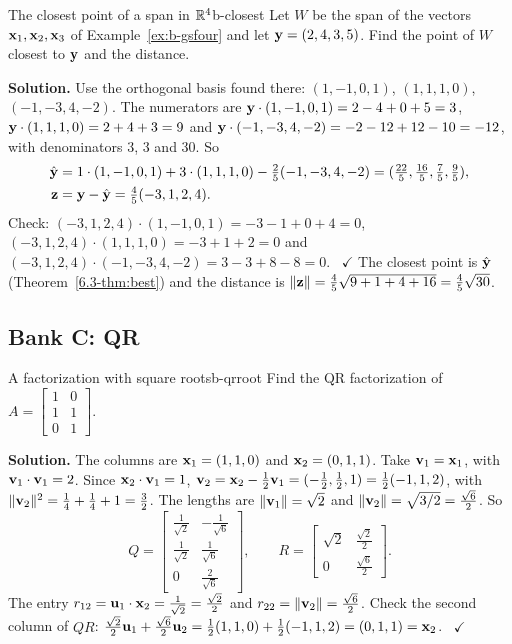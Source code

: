 \documentclass[11pt]{article}
\begin{document}
\begin{exmp}{The closest point of a span in $\mathbb{R}^4$}{b-closest}
Let $W$ be the span of the vectors $\mathbf{x}_1,\mathbf{x}_2,\mathbf{x}_3$ of Example~\ref{ex:b-gsfour} and let $\mathbf{y}=(2,4,3,5)$. Find the point of $W$ closest to $\mathbf{y}$ and the distance.

\textbf{Solution.} Use the orthogonal basis found there: $(1,-1,0,1)$, $(1,1,1,0)$, $(-1,-3,4,-2)$. The numerators are $\mathbf{y}\cdot(1,-1,0,1)=2-4+0+5=3$, $\mathbf{y}\cdot(1,1,1,0)=2+4+3=9$ and $\mathbf{y}\cdot(-1,-3,4,-2)=-2-12+12-10=-12$, with denominators $3$, $3$ and $30$. So
\[
\begin{aligned}\hat{\mathbf{y}}&=1\cdot(1,-1,0,1)+3\cdot(1,1,1,0)-\tfrac25(-1,-3,4,-2)=(\tfrac{22}5,\tfrac{16}5,\tfrac75,\tfrac95),\\\mathbf{z}&=\mathbf{y}-\hat{\mathbf{y}}=\tfrac45(-3,1,2,4).\end{aligned}
\]
Check: $(-3,1,2,4)\cdot(1,-1,0,1)=-3-1+0+4=0$, $(-3,1,2,4)\cdot(1,1,1,0)=-3+1+2=0$ and $(-3,1,2,4)\cdot(-1,-3,4,-2)=3-3+8-8=0$. \ $\checkmark$ The closest point is $\hat{\mathbf{y}}$ (Theorem~\ref{6.3-thm:best}) and the distance is $\lVert\mathbf{z}\rVert=\tfrac45\sqrt{9+1+4+16}=\tfrac45\sqrt{30}$.
\end{exmp}

\subsection*{Bank C: QR}
\begin{exmp}{A factorization with square roots}{b-qrroot}
Find the QR factorization of $A=\begin{bmatrix}1&0\\1&1\\0&1\end{bmatrix}$.

\textbf{Solution.} The columns are $\mathbf{x}_1=(1,1,0)$ and $\mathbf{x}_2=(0,1,1)$. Take $\mathbf{v}_1=\mathbf{x}_1$, with $\mathbf{v}_1\cdot\mathbf{v}_1=2$. Since $\mathbf{x}_2\cdot\mathbf{v}_1=1$, $\mathbf{v}_2=\mathbf{x}_2-\tfrac12\mathbf{v}_1=(-\tfrac12,\tfrac12,1)=\tfrac12(-1,1,2)$, with $\lVert\mathbf{v}_2\rVert^2=\tfrac14+\tfrac14+1=\tfrac32$. The lengths are $\lVert\mathbf{v}_1\rVert=\sqrt2$ and $\lVert\mathbf{v}_2\rVert=\sqrt{3/2}=\tfrac{\sqrt6}2$. So
\[
Q=\begin{bmatrix}\tfrac1{\sqrt2}&-\tfrac1{\sqrt6}\\[2pt]\tfrac1{\sqrt2}&\tfrac1{\sqrt6}\\[2pt]0&\tfrac2{\sqrt6}\end{bmatrix},\qquad R=\begin{bmatrix}\sqrt2&\tfrac{\sqrt2}2\\0&\tfrac{\sqrt6}2\end{bmatrix}.
\]
The entry $r_{12}=\mathbf{u}_1\cdot\mathbf{x}_2=\tfrac1{\sqrt2}=\tfrac{\sqrt2}2$ and $r_{22}=\lVert\mathbf{v}_2\rVert=\tfrac{\sqrt6}2$. Check the second column of $QR$: $\tfrac{\sqrt2}2\mathbf{u}_1+\tfrac{\sqrt6}2\mathbf{u}_2=\tfrac12(1,1,0)+\tfrac12(-1,1,2)=(0,1,1)=\mathbf{x}_2$. \ $\checkmark$
\end{exmp}
\end{document}
